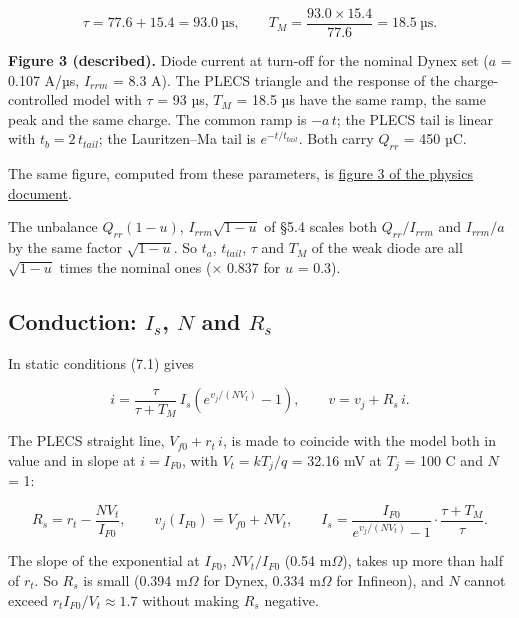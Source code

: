 \documentclass[11pt,a4paper,numbers=noenddot]{scrartcl}
\begin{document}
\begin{onehalfspace}
\[\tau = 77.6 + 15.4 = 93.0\ \text{µs}, \qquad T_M = \frac{93.0 \times 15.4}{77.6} = 18.5\ \text{µs}.\]

\textbf{Figure 3 (described).} Diode current at turn-off for the nominal Dynex set (\(a\) = 0.107 A/µs, \(I_{rrm}\) = 8.3 A). The PLECS triangle and the response of the charge-controlled model with \(\tau\) = 93 µs, \(T_M\) = 18.5 µs have the same ramp, the same peak and the same charge. The common ramp is \(-a\,t\); the PLECS tail is linear with \(t_b = 2\,t_{tail}\); the Lauritzen--Ma tail is \(e^{-t/t_{tail}}\). Both carry \(Q_{rr}\) = 450 µC.

\begin{mybox}
The same figure, computed from these parameters, is \href{https://github.com/pwr-control/Semiconductor-Physics-and-Devices/blob/main/diode-reverse-recovery/figures/fig3_recovery_waveform.svg}{figure 3 of the physics document}.
\end{mybox}

The unbalance \(Q_{rr}(1-u)\), \(I_{rrm}\sqrt{1-u}\) of \S5.4 scales both \(Q_{rr}/I_{rrm}\) and \(I_{rrm}/a\) by the same factor \(\sqrt{1-u}\). So \(t_a\), \(t_{tail}\), \(\tau\) and \(T_M\) of the weak diode are all \(\sqrt{1-u}\) times the nominal ones (\(\times\) 0.837 for \(u\) = 0.3).

\subsection{\texorpdfstring{Conduction: \(I_s\), \(N\) and \(R_s\)}{Conduction: I\_s, N and R\_s}}\label{conduction-i_s-n-and-r_s}

In static conditions (7.1) gives

\[i = \frac{\tau}{\tau + T_M}\, I_s \left(e^{v_j/(N V_t)} - 1\right), \qquad v = v_j + R_s\, i.\]

The PLECS straight line, \(V_{f0} + r_t\, i\), is made to coincide with the model both in value and in slope at \(i = I_{F0}\), with \(V_t = kT_j/q\) = 32.16 mV at \(T_j\) = 100 \textdegree{}C and \(N\) = 1:

\[R_s = r_t - \frac{N V_t}{I_{F0}}, \qquad v_j(I_{F0}) = V_{f0} + N V_t, \qquad I_s = \frac{I_{F0}}{e^{v_j/(N V_t)} - 1}\cdot\frac{\tau + T_M}{\tau}. \tag{7.6}\]

The slope of the exponential at \(I_{F0}\), \(N V_t/I_{F0}\) (0.54 m\(\Omega\)), takes up more than half of \(r_t\). So \(R_s\) is small (0.394 m\(\Omega\) for Dynex, 0.334 m\(\Omega\) for Infineon), and \(N\) cannot exceed \(r_t I_{F0}/V_t \approx 1.7\) without making \(R_s\) negative.


\end{onehalfspace}
\end{document}
